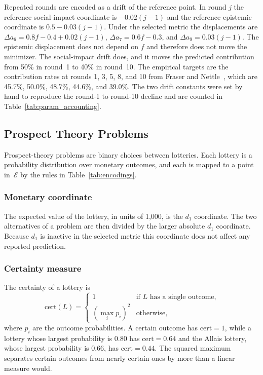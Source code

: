 \documentclass[journal]{IEEEtran}
\newcommand{\E}{\mathcal{E}}               %
\begin{document}
Repeated rounds are encoded as a drift of the reference point.
In round $j$ the reference social-impact coordinate is $-0.02(j-1)$ and the reference epistemic coordinate is $0.5-0.03(j-1)$.
Under the selected metric the displacements are $\Delta a_6 = 0.8f-0.4+0.02(j-1)$, $\Delta a_7 = 0.6f-0.3$, and $\Delta a_9 = 0.03(j-1)$.
The epistemic displacement does not depend on $f$ and therefore does not move the minimizer.
The social-impact drift does, and it moves the predicted contribution from 50\% in round~1 to 40\% in round~10.
The empirical targets are the contribution rates at rounds 1, 3, 5, 8, and 10 from Fraser and Nettle~\cite{fraser2020}, which are 45.7\%, 50.0\%, 48.7\%, 44.6\%, and 39.0\%.
The two drift constants were set by hand to reproduce the round-1 to round-10 decline and are counted in Table~\ref{tab:param_accounting}.

\subsection{Prospect Theory Problems}

Prospect-theory problems are binary choices between lotteries.
Each lottery is a probability distribution over monetary outcomes, and each is mapped to a point in~$\E$ by the rules in Table~\ref{tab:encodings}.

\subsubsection{Monetary coordinate}
The expected value of the lottery, in units of 1,000, is the $d_1$ coordinate.
The two alternatives of a problem are then divided by the larger absolute $d_1$ coordinate.
Because $d_1$ is inactive in the selected metric this coordinate does not affect any reported prediction.

\subsubsection{Certainty measure}
The certainty of a lottery is
\begin{equation}
    \mathrm{cert}(L) = \begin{cases} 1 & \text{if $L$ has a single outcome,} \\ \left(\max_i p_i\right)^2 & \text{otherwise,}\end{cases}
    \label{eq:certainty}
\end{equation}
where $p_i$ are the outcome probabilities.
A certain outcome has $\mathrm{cert}=1$, while a lottery whose largest probability is $0.80$ has $\mathrm{cert}=0.64$ and the Allais lottery, whose largest probability is $0.66$, has $\mathrm{cert}=0.44$.
The squared maximum separates certain outcomes from nearly certain ones by more than a linear measure would.
\end{document}

